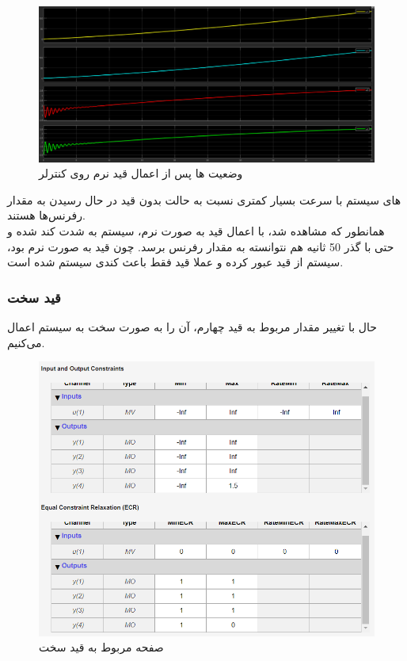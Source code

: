 \documentclass[14pt, a4paper]{extarticle}
\begin{document}
\newpage
\begin{figure}[h!]
	\centering
	\includegraphics[scale = 0.3]{Q2_2_1_states.png}
	\caption{وضعیت 
		ها پس از اعمال قید نرم روی کنترلر}
\end{figure}

های سیستم با سرعت بسیار کمتری نسبت به حالت بدون قید در حال رسیدن به مقدار رفرنس‌ها هستند.\\
همانطور که مشاهده شد، با اعمال قید به صورت نرم،‌ سیستم به شدت کند شده و حتی با گذر 50 ثانیه هم نتوانسته به مقدار رفرنس برسد. چون قید به صورت نرم بود، سیستم از قید عبور کرده و عملا قید فقط باعث کندی سیستم شده است.



\subsubsection{قید سخت}
حال با تغییر مقدار 
مربوط به قید چهارم، آن را به صورت سخت به سیستم اعمال می‌کنیم. 

\begin{figure}[h!]
	\centering
	\includegraphics[scale = 0.5]{Q2_2_2_cons.png}
	\caption{صفحه مربوط به قید سخت 
		}
\end{figure}
\end{document}
